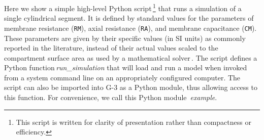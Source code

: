 \documentclass[10pt]{article}
\begin{document}
Here we show a simple high-level Python script\,\footnote{This script
  is written for clarity of presentation rather than compactness or
  efficiency.} that runs
a simulation of a single cylindrical segment. It is defined by standard
values for the parameters of membrane resistance ({\tt RM}), axial resistance ({\tt RA}), and
membrane capacitance ({\tt CM}).
These parameters are given by their specific values (in SI units) as
commonly reported in the literature, instead of their actual values
scaled to the compartment surface area as used by a mathematical
solver\,\cite{cornelis04:_neuros_param_handl}. The script defines a
Python function\,{\it run\_simulation} that will load and run a model when invoked from
a system command line on an appropriately configured computer.  The script
can also be imported into G-3 as a Python module, thus allowing access
to this function.  For convenience, we call this Python module\,{\it
  example}.
\end{document}
